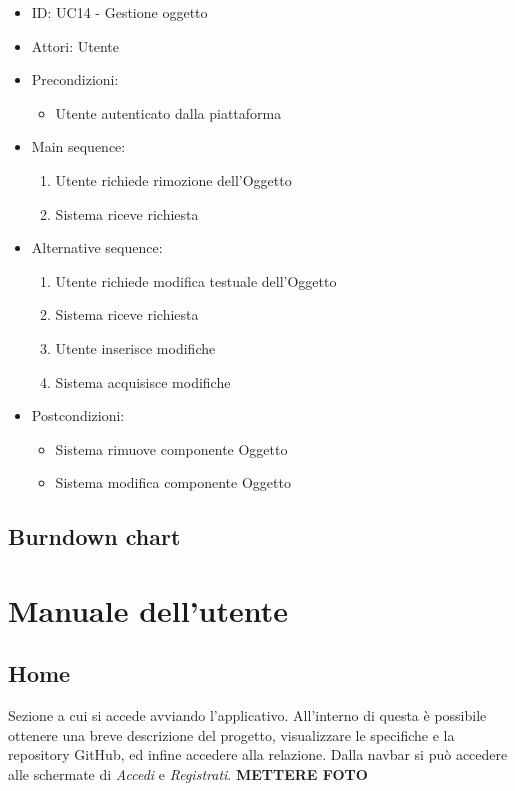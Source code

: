 \documentclass{article}
\begin{document}
\begin{itemize}[label = {-}]
    \itemsep0px
    \item ID: UC14 - Gestione oggetto
    \item Attori: Utente
    \item Precondizioni: 
        \begin{itemize}[label = {-}]
            \item Utente autenticato dalla piattaforma
        \end{itemize}
    \item Main sequence: 
        \begin{enumerate}
            \item Utente richiede rimozione dell'Oggetto
            \item Sistema riceve richiesta
        \end{enumerate}
    \item Alternative sequence:
        \begin{enumerate}
            \item Utente richiede modifica testuale dell'Oggetto
            \item Sistema riceve richiesta
            \item Utente inserisce modifiche
            \item Sistema acquisisce modifiche
        \end{enumerate}
    \item Postcondizioni: 
        \begin{itemize}[label = {-}]
            \item Sistema rimuove componente Oggetto
            \item Sistema modifica componente Oggetto
        \end{itemize}
\end{itemize}

\newpage
\subsection{Burndown chart}

\newpage
\section{Manuale dell'utente}
\subsection*{Home}
Sezione a cui si accede avviando l'applicativo. All'interno di questa è possibile ottenere una breve descrizione del progetto, visualizzare le specifiche e la repository GitHub, ed infine accedere alla relazione. Dalla navbar si può accedere alle schermate di \textit{Accedi} e \textit{Registrati}.
\textbf{METTERE FOTO}
\end{document}
